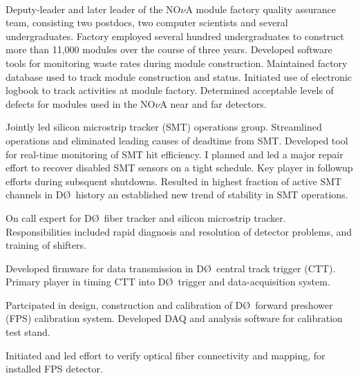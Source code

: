 \documentclass[amsmath,amssymb]{revtex4}
\def\dzero{D\O}
\begin{document}
\\
 
\begin{list}{}
            {\setlength{\itemsep}{0.0in}\setlength{\parsep}{0.0in}
             \addtolength{\parskip}{-0.5in}}
\item Deputy-leader and later leader of the  NO$\nu$A module
 factory quality assurance team, consisting two postdocs, two
 computer scientists and several undergraduates.  Factory employed
 several hundred undergraduates to construct more than 11,000 modules
 over the course of three years.  Developed software tools for
 monitoring waste rates during module construction.  Maintained factory 
 database used to track module construction and status.  Initiated use of
 electronic logbook to track activities at module factory.  Determined
 acceptable levels of defects for modules used in the NO$\nu$A near and far
 detectors.  
\item Jointly led silicon microstrip tracker (SMT) operations group.
  Streamlined operations and eliminated leading causes of deadtime
  from SMT.  Developed tool for real-time monitoring of SMT hit
  efficiency.  I planned and led a major repair effort to
  recover disabled SMT sensors on a tight schedule.  Key player in
  followup efforts during subsquent shutdowns.  Resulted in highest
  fraction of active SMT channels in \dzero~history an established new
  trend of stability in SMT operations.
\item On call expert for \dzero~fiber tracker and silicon microstrip
  tracker.  Responsibilities included rapid diagnosis and
  resolution of detector problems, and training of shifters.
\item Developed firmware for data transmission in \dzero~central track
  trigger (CTT). Primary player in timing CTT into \dzero~trigger and
  data-acquisition system.
\item Partcipated in design, construction and calibration of
  \dzero~forward preshower (FPS) calibration system.  Developed DAQ
  and analysis software for calibration test stand.
\item Initiated and led effort to verify optical fiber connectivity
  and mapping, for installed FPS detector.
\end{list}

\\
\end{document}
